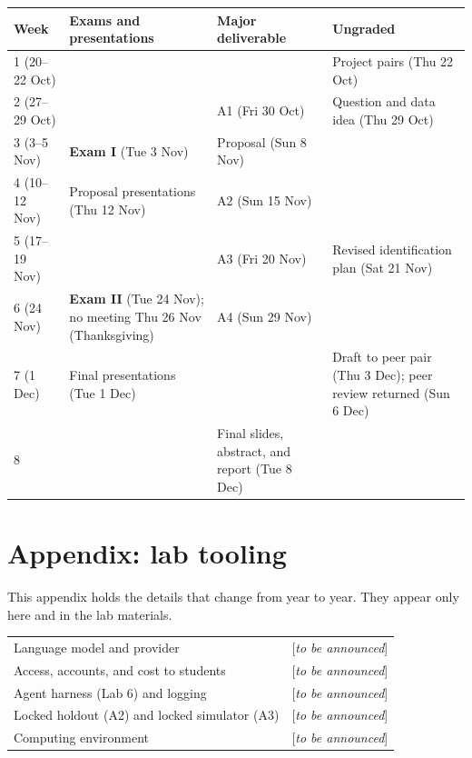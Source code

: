 \documentclass[11pt]{article}
\newcommand{\tbd}[1]{\textcolor{warnred}{[\emph{#1}]}}
\begin{document}
\begin{center}
\small
\begin{tabular}{L{2.4cm}L{4.4cm}L{3.6cm}L{4.4cm}}
\toprule
\textbf{Week} & \textbf{Exams and presentations} & \textbf{Major deliverable} & \textbf{Ungraded} \\
 (20--22 Oct) & & & Project pairs (Thu 22 Oct) \\
2 (27--29 Oct) & & A1 (Fri 30 Oct) & Question and data idea (Thu 29 Oct) \\
3 (3--5 Nov) & \textbf{Exam I} (Tue 3 Nov) & Proposal (Sun 8 Nov) & \\
4 (10--12 Nov) & Proposal presentations (Thu 12 Nov) & A2 (Sun 15 Nov) & \\
5 (17--19 Nov) & & A3 (Fri 20 Nov) & Revised identification plan (Sat 21 Nov) \\
6 (24 Nov) & \textbf{Exam II} (Tue 24 Nov); no meeting Thu 26 Nov (Thanksgiving) & A4 (Sun 29 Nov) & \\
7 (1 Dec) & Final presentations (Tue 1 Dec) & & Draft to peer pair (Thu 3 Dec); peer review returned (Sun 6 Dec) \\
8 & & Final slides, abstract, and report (Tue 8 Dec) & \\
\bottomrule
\end{tabular}
\end{center}

\appendix
\section*{Appendix: lab tooling}

This appendix holds the details that change from year to year. They appear only here and in the lab
materials.

\begin{center}
\small
\begin{tabular}{L{5cm}L{9.5cm}}
\toprule
Language model and provider & \tbd{to be announced} \\
Access, accounts, and cost to students & \tbd{to be announced} \\
Agent harness (Lab 6) and logging & \tbd{to be announced} \\
Locked holdout (A2) and locked simulator (A3) & \tbd{to be announced} \\
Computing environment & \tbd{to be announced} \\
\bottomrule
\end{tabular}
\end{center}
\end{document}
